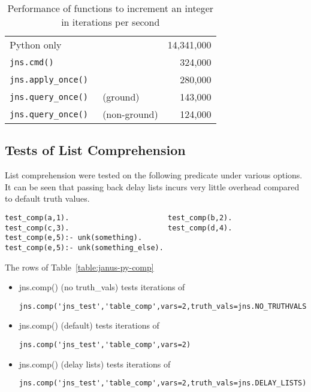 \begin{table}[hbt] \label{table:janus-py-latency}
  \begin{centering}
\begin{tabular}{llr} \hline
Python only               &                   & 14,341,000 \\ 
{\tt jns.cmd()}           &                   &    324,000\\
{\tt jns.apply\_once()}   &                   &    280,000\\
{\tt jns.query\_once() }  & (ground)          &    143,000 \\
{\tt jns.query\_once()}   & (non-ground)      &    124,000 \\  \hline 
\end{tabular}        
\caption{Performance of functions to increment an integer in
  iterations per second}
  \end{centering}
\end{table}

\subsection{Tests of List Comprehension}
List comprehension were tested on the following predicate under
various options.  It can be seen that passing back delay lists incurs
very little overhead compared to default truth values.
\begin{verbatim}
test_comp(a,1).                       test_comp(b,2).
test_comp(c,3).                       test_comp(d,4).
test_comp(e,5):- unk(something).
test_comp(e,5):- unk(something_else).
\end{verbatim}
The rows of Table~\ref{table:janus-py-comp}
\begin{itemize}   
\item jns.comp() (no truth\_vals) tests iterations of 
\begin{verbatim}
jns.comp('jns_test','table_comp',vars=2,truth_vals=jns.NO_TRUTHVALS)
\end{verbatim}
\item jns.comp() (default) tests iterations of 
\begin{verbatim}
jns.comp('jns_test','table_comp',vars=2)
\end{verbatim}
\item jns.comp() (delay lists) tests iterations of 
\begin{verbatim}
jns.comp('jns_test','table_comp',vars=2,truth_vals=jns.DELAY_LISTS)
\end{verbatim}
\end{itemize}

